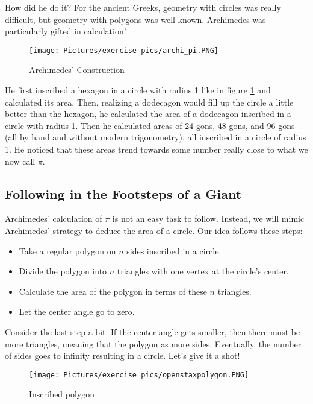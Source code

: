 \noindent How did he do it? For the ancient Greeks, geometry with circles was really difficult, but geometry with polygons was well-known. Archimedes was particularly gifted in calculation! 

\begin{figure}[h]
    \centering
    \texttt{[image: Pictures/exercise pics/archi\_pi.PNG]}
    \caption{Archimedes' Construction}
    \label{fig:archi_pi}
\end{figure}

\noindent He first inscribed a hexagon in a circle with radius 1 like in figure \ref{fig:archi_pi} and calculated its area. Then, realizing a dodecagon would fill up the circle a little better than the hexagon, he calculated the area of a dodecagon inscribed in a circle with radius 1. Then he calculated areas of 24-gons, 48-gons, and 96-gons (all by hand and without modern trigonometry), all inscribed in a circle of radius 1. He noticed that these areas trend towards some number really close to what we now call $\pi$. 

\subsection{Following in the Footsteps of a Giant}

Archimedes' calculation of $\pi$ is not an easy task to follow. Instead, we will mimic Archimedes' strategy to deduce the area of a circle. Our idea follows these steps:

\begin{itemize}
    \item Take a regular polygon on $n$ sides inscribed in a circle. \item Divide the polygon into $n$ triangles with one vertex at the circle's center.
    \item Calculate the area of the polygon in terms of these $n$ triangles.
    \item Let the center angle go to zero.
\end{itemize}

Consider the last step a bit. If the center angle gets smaller, then there must be more triangles, meaning that the polygon as more sides. Eventually, the number of sides goes to infinity resulting in a circle. Let's give it a shot!

\begin{figure}[h]
    \centering
    \texttt{[image: Pictures/exercise pics/openstaxpolygon.PNG]}
    \caption{Inscribed polygon}
    \label{fig:openstaxpolygon}
\end{figure}

